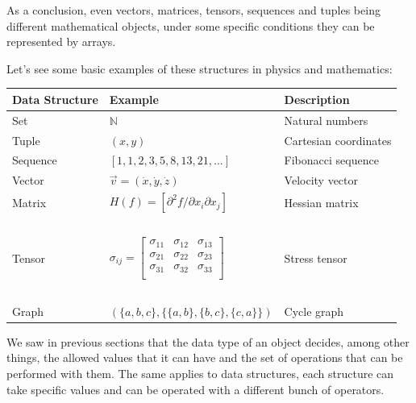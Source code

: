 As a conclusion, even vectors, matrices, tensors, sequences and tuples being different mathematical objects, 
under some specific conditions they can be represented by arrays.

Let's see some basic examples of these structures in physics and mathematics:
\vspace{-.5cm}
\renewcommand{\arraystretch}{1.5} %
\begin{table}[!h]
    \centering
    \begin{tabular}{|l|l|l|}
        \hline
        \textbf{Data Structure}  & \textbf{Example}  & \textbf{Description}  \\ \hline
        Set  & $\mathbb{N}$ & Natural numbers \\ \hline
        Tuple  & $(x,y)$ & Cartesian coordinates \\ \hline
        Sequence  & $[1,1,2,3,5,8,13,21,...]$ & Fibonacci sequence \\ \hline
        Vector  & $\vec{v} = (\dot{x},\dot{y},\dot{z})$ & Velocity vector \\ \hline
        Matrix  & $H(f) = \left[ \partial^2f / \partial x_i\partial x_j \right]$  &   Hessian matrix   \\ \hline 
        ~  & ~  &   ~   \\[0pt]
        Tensor & $\sigma_{ij} = \left[{\begin{matrix}
                \sigma _{11} & \sigma _{12} & \sigma _{13} \\
                \sigma _{21} & \sigma _{22} & \sigma _{23} \\
                \sigma _{31} & \sigma _{32} & \sigma _{33} \\
        \end{matrix}}\right]$ & Stress tensor  \\
        ~  & ~  &   ~   \\[0pt] \hline
        Graph  & $(\{a,b,c\}, \{\{a,b\},\{b,c\},\{c,a\}\})$ & Cycle graph  \\ \hline
    \end{tabular}
\end{table}

We saw in previous sections that the data type of an object decides, among other things, 
the allowed values that it can have and 
the set of operations that can be performed with them. 
The same applies to data structures, each structure can take specific values and 
can be operated with a different bunch of operators.






